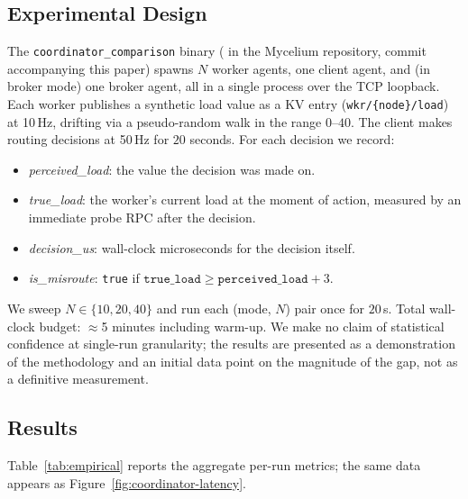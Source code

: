 \documentclass[11pt]{article}
\theoremstyle{definition}
\theoremstyle{plain}
\theoremstyle{plain}
\begin{document}
\subsection{Experimental Design}

The \texttt{coordinator\_comparison} binary
( in the Mycelium repository,
commit accompanying this paper) spawns $N$ worker agents, one client agent,
and (in broker mode) one broker agent, all in a single process over the
TCP loopback. Each worker publishes a synthetic load value as a KV entry
(\texttt{wkr/\{node\}/load}) at 10\,Hz, drifting via a pseudo-random walk
in the range $0$--$40$. The client makes routing decisions at 50\,Hz for
$20$ seconds. For each decision we record:

\begin{itemize}
\item \emph{perceived\_load}: the value the decision was made on.
\item \emph{true\_load}: the worker's current load at the moment of action,
  measured by an immediate probe RPC after the decision.
\item \emph{decision\_us}: wall-clock microseconds for the decision itself.
\item \emph{is\_misroute}: \texttt{true} if
  $\texttt{true\_load} \geq \texttt{perceived\_load} + 3$.
\end{itemize}

We sweep $N \in \{10, 20, 40\}$ and run each (mode, $N$) pair once for
$20$\,s. Total wall-clock budget: $\approx$5 minutes including warm-up.
We make no claim of statistical confidence at single-run granularity; the
results are presented as a demonstration of the methodology and an initial
data point on the magnitude of the gap, not as a definitive measurement.

\subsection{Results}



Table~\ref{tab:empirical} reports the aggregate per-run metrics; the same
data appears as Figure~\ref{fig:coordinator-latency}.
\end{document}
